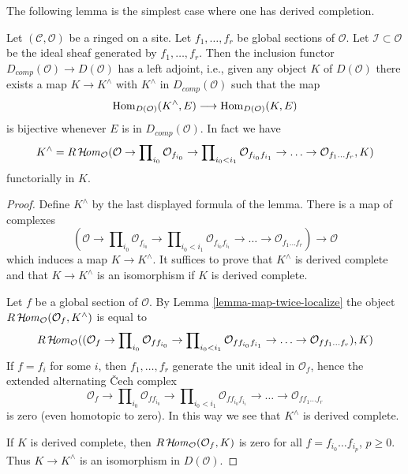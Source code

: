 \noindent
The following lemma is the simplest case where one has derived completion.

\begin{lemma}
\label{lemma-derived-completion}
Let $(\mathcal{C}, \mathcal{O})$ be a ringed on a site. Let $f_1, \ldots, f_r$
be global sections of $\mathcal{O}$. Let $\mathcal{I} \subset \mathcal{O}$ be
the ideal sheaf generated by $f_1, \ldots, f_r$.
Then the inclusion functor $D_{comp}(\mathcal{O}) \to D(\mathcal{O})$
has a left adjoint, i.e., given any object $K$ of $D(\mathcal{O})$
there exists a map $K \to K^\wedge$ with $K^\wedge$ in $D_{comp}(\mathcal{O})$
such that the map
$$
\mathop{\mathrm{Hom}}\nolimits_{D(\mathcal{O})}(K^\wedge, E) \longrightarrow \mathop{\mathrm{Hom}}\nolimits_{D(\mathcal{O})}(K, E)
$$
is bijective whenever $E$ is in $D_{comp}(\mathcal{O})$. In fact
we have
$$
K^\wedge =
R\mathop{\mathcal{H}\!\mathit{om}}\nolimits_\mathcal{O}
(\mathcal{O} \to \prod\nolimits_{i_0} \mathcal{O}_{f_{i_0}} \to
\prod\nolimits_{i_0 < i_1} \mathcal{O}_{f_{i_0}f_{i_1}} \to
\ldots \to \mathcal{O}_{f_1\ldots f_r}, K)
$$
functorially in $K$.
\end{lemma}

\begin{proof}
Define $K^\wedge$ by the last displayed formula of the lemma.
There is a map of complexes
$$
(\mathcal{O} \to \prod\nolimits_{i_0} \mathcal{O}_{f_{i_0}} \to
\prod\nolimits_{i_0 < i_1} \mathcal{O}_{f_{i_0}f_{i_1}} \to
\ldots \to \mathcal{O}_{f_1\ldots f_r}) \longrightarrow \mathcal{O}
$$
which induces a map $K \to K^\wedge$. It suffices to prove that
$K^\wedge$ is derived complete and that $K \to K^\wedge$ is an
isomorphism if $K$ is derived complete.

\medskip\noindent
Let $f$ be a global section of $\mathcal{O}$.
By Lemma \ref{lemma-map-twice-localize} the object
$R\mathop{\mathcal{H}\!\mathit{om}}\nolimits_\mathcal{O}(\mathcal{O}_f, K^\wedge)$
is equal to
$$
R\mathop{\mathcal{H}\!\mathit{om}}\nolimits_\mathcal{O}(
(\mathcal{O}_f \to \prod\nolimits_{i_0} \mathcal{O}_{ff_{i_0}} \to
\prod\nolimits_{i_0 < i_1} \mathcal{O}_{ff_{i_0}f_{i_1}} \to
\ldots \to \mathcal{O}_{ff_1\ldots f_r}), K)
$$
If $f = f_i$ for some $i$, then $f_1, \ldots, f_r$ generate the
unit ideal in $\mathcal{O}_f$, hence the extended alternating
{\v C}ech complex
$$
\mathcal{O}_f \to \prod\nolimits_{i_0} \mathcal{O}_{ff_{i_0}} \to
\prod\nolimits_{i_0 < i_1} \mathcal{O}_{ff_{i_0}f_{i_1}} \to
\ldots \to \mathcal{O}_{ff_1\ldots f_r}
$$
is zero (even homotopic to zero). In this way we see that $K^\wedge$
is derived complete.

\medskip\noindent
If $K$ is derived complete, then $R\mathop{\mathcal{H}\!\mathit{om}}\nolimits_\mathcal{O}(\mathcal{O}_f, K)$
is zero for all $f = f_{i_0} \ldots f_{i_p}$, $p \geq 0$. Thus
$K \to K^\wedge$ is an isomorphism in $D(\mathcal{O})$.
\end{proof}

